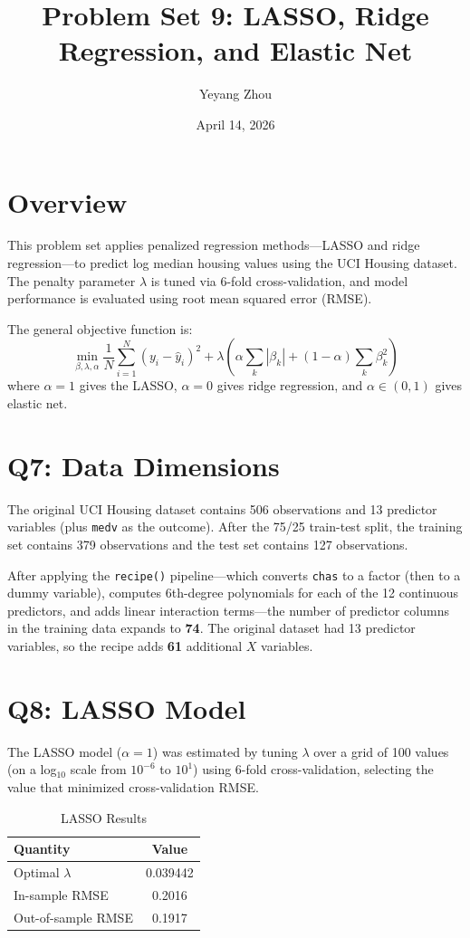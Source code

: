 \documentclass[12pt]{article}
\title{Problem Set 9: LASSO, Ridge Regression, and Elastic Net}
\author{Yeyang Zhou}
\date{April 14, 2026}
\begin{document}
\maketitle
\onehalfspacing

\section*{Overview}

This problem set applies penalized regression methods---LASSO and ridge regression---to predict log median housing values using the UCI Housing dataset. The penalty parameter $\lambda$ is tuned via 6-fold cross-validation, and model performance is evaluated using root mean squared error (RMSE).

The general objective function is:
\[
\min_{\beta,\lambda,\alpha} \frac{1}{N}\sum_{i=1}^{N}(y_i - \hat{y}_i)^2 + \lambda\left(\alpha\sum_k|\beta_k| + (1-\alpha)\sum_k\beta_k^2\right)
\]
where $\alpha = 1$ gives the LASSO, $\alpha = 0$ gives ridge regression, and $\alpha \in (0,1)$ gives elastic net.

\section*{Q7: Data Dimensions}

The original UCI Housing dataset contains 506 observations and 13 predictor variables (plus \texttt{medv} as the outcome). After the 75/25 train-test split, the training set contains 379 observations and the test set contains 127 observations.

After applying the \texttt{recipe()} pipeline---which converts \texttt{chas} to a factor (then to a dummy variable), computes 6th-degree polynomials for each of the 12 continuous predictors, and adds linear interaction terms---the number of predictor columns in the training data expands to \textbf{74}. The original dataset had 13 predictor variables, so the recipe adds \textbf{61} additional $X$ variables.

\section*{Q8: LASSO Model}

The LASSO model ($\alpha = 1$) was estimated by tuning $\lambda$ over a grid of 100 values (on a log$_{10}$ scale from $10^{-6}$ to $10^{1}$) using 6-fold cross-validation, selecting the value that minimized cross-validation RMSE.

\begin{table}[h]
\centering
\caption{LASSO Results}
\begin{tabular}{lc}
\toprule
\textbf{Quantity} & \textbf{Value} \\
\midrule
Optimal $\lambda$ & 0.039442 \\
In-sample RMSE    & 0.2016 \\
Out-of-sample RMSE & 0.1917 \\
\bottomrule
\end{tabular}
\end{table}
\end{document}
